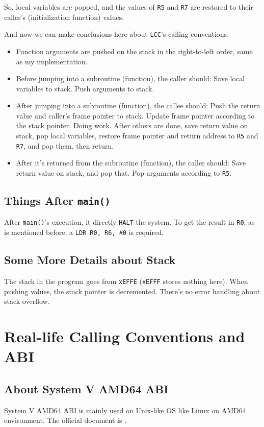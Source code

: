 \documentclass{article}
\begin{document}
	So, local variables are popped, and the values of \texttt{R5} and \texttt{R7} are restored to their caller's (initialization function) values.
	
	And now we can make conclusions here about \texttt{LCC}'s calling conventions.
	
	\begin{itemize}
	\item Function arguments are pushed on the stack in the right-to-left order, same as my implementation.
	\item Before jumping into a subroutine (function), the caller should:
	\subitem Save local variables to stack.
	\subitem Push arguments to stack.
	\item After jumping into a subroutine (function), the callee should:
	\subitem Push the return value and caller's frame pointer to stack.
	\subitem Update frame pointer according to the stack pointer.
	\subitem Doing work.
	\subitem After others are done, save return value on stack, pop local variables, restore frame pointer and return address to \texttt{R5} and \texttt{R7}, and pop them, then return.
	\item After it’s returned from the subroutine (function), the caller should:
	\subitem Save return value on stack, and pop that.
	\subitem Pop arguments according to \texttt{R5}.
	\end{itemize}
	
	\subsection{Things After \texttt{main()}}
	After \texttt{main()}'s execution, it directly \texttt{HALT} the system. To get the result in \texttt{R0}, as is mentioned before, a \texttt{LDR R0, R6, \#0} is required.
	
	\subsection{Some More Details about Stack}
	The stack in the program goes from \texttt{xEFFE} (\texttt{xEFFF} stores nothing here). When pushing values, the stack pointer is decremented. There's no error handling about stack overflow.
	
	\section{Real-life Calling Conventions and ABI}
	\subsection{About System V AMD64 ABI}
	System V AMD64 ABI is mainly used on Unix-like OS like Linux on AMD64 environment. The official document is \cite[The x86-64 psABI version 1.0]{amd64-abi}.
	
\end{document}
